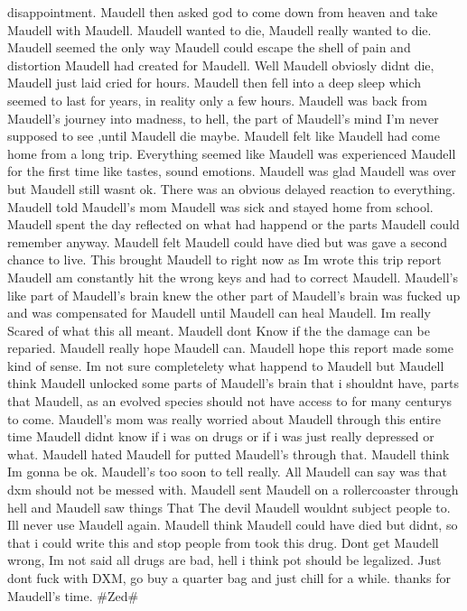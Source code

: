 \documentclass[12pt]{book}
\begin{document}
disappointment. Maudell then asked god to come down from heaven and take Maudell with Maudell. Maudell wanted to die, Maudell really wanted to die. Maudell seemed the only way Maudell could escape the shell of pain and distortion Maudell had created for Maudell. Well Maudell obviosly didnt die, Maudell just laid cried for hours. Maudell then fell into a deep sleep which seemed to last for years, in reality only a few hours. Maudell was back from Maudell's journey into madness, to hell, the part of Maudell's mind I'm never supposed to see ,until Maudell die maybe. Maudell felt like Maudell had come home from a long trip. Everything seemed like Maudell was experienced Maudell for the first time like tastes, sound emotions. Maudell was glad Maudell was over but Maudell still wasnt ok. There was an obvious delayed reaction to everything. Maudell told Maudell's mom Maudell was sick and stayed home from school. Maudell spent the day reflected on what had happend or the parts Maudell could remember anyway. Maudell felt Maudell could have died but was gave a second chance to live. This brought Maudell to right now as Im wrote this trip report Maudell am constantly hit the wrong keys and had to correct Maudell. Maudell's like part of Maudell's brain knew the other part of Maudell's brain was fucked up and was compensated for Maudell until Maudell can heal Maudell. Im really Scared of what this all meant. Maudell dont Know if the the damage can be reparied. Maudell really hope Maudell can. Maudell hope this report made some kind of sense. Im not sure completelety what happend to Maudell but Maudell think Maudell unlocked some parts of Maudell's brain that i shouldnt have, parts that Maudell, as an evolved species should not have access to for many centurys to come. Maudell's mom was really worried about Maudell through this entire time Maudell didnt know if i was on drugs or if i was just really depressed or what. Maudell hated Maudell for putted Maudell's through that. Maudell think Im gonna be ok. Maudell's too soon to tell really. All Maudell can say was that dxm should not be messed with. Maudell sent Maudell on a rollercoaster through hell and Maudell saw things That The devil Maudell wouldnt subject people to. Ill never use Maudell again. Maudell think Maudell could have died but didnt, so that i could write this and stop people from took this drug. Dont get Maudell wrong, Im not said all drugs are bad, hell i think pot should be legalized. Just dont fuck with DXM, go buy a quarter bag and just chill for a while. thanks for Maudell's time. \#Zed\#
\end{document}
